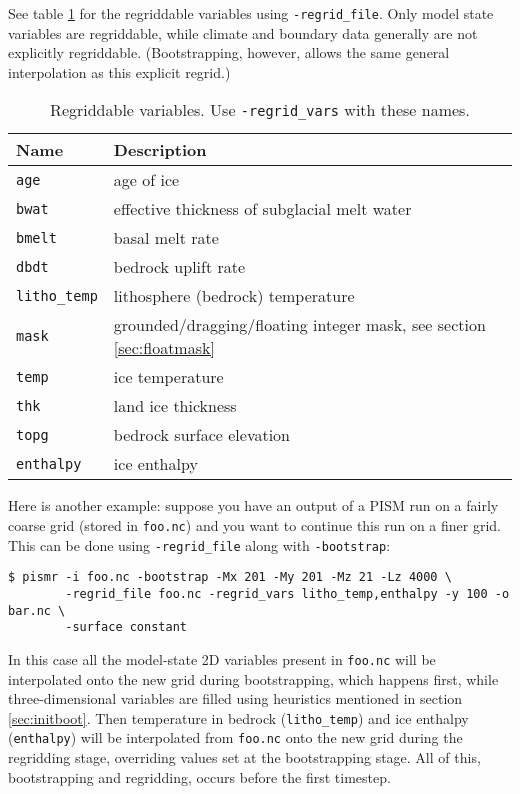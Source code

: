 See table \ref{tab:regridvar} for the regriddable variables using
\texttt{-regrid_file}.  Only model state variables are regriddable, while climate and boundary data generally are not explicitly regriddable.  (Bootstrapping, however, allows the same general interpolation as this explicit regrid.)

\begin{table}[ht]
  \centering
  \begin{tabular}{ll}\toprule
    \textbf{Name} & \textbf{Description}\\ \midrule
    \texttt{age} & age of ice\\
    \texttt{bwat} & effective thickness of subglacial melt water \\
    \texttt{bmelt} & basal melt rate \\
    \texttt{dbdt} & bedrock uplift rate \\
    \texttt{litho_temp} & lithosphere (bedrock) temperature \\
    \texttt{mask} & grounded/dragging/floating integer mask, see section \ref{sec:floatmask} \\
    \texttt{temp} & ice temperature \\
    \texttt{thk} & land ice thickness \\
    \texttt{topg} & bedrock surface elevation \\
    \texttt{enthalpy} & ice enthalpy\\
    \bottomrule
  \end{tabular}
\caption{Regriddable variables.  Use \texttt{-regrid_vars} with these names.}
\label{tab:regridvar}
\end{table}

Here is another example: suppose you have an output of a PISM run on a fairly
coarse grid (stored in \texttt{foo.nc}) and you want to continue this run on a
finer grid. This can be done using \texttt{-regrid_file} along with
\texttt{-bootstrap}:
\begin{verbatim}
$ pismr -i foo.nc -bootstrap -Mx 201 -My 201 -Mz 21 -Lz 4000 \
        -regrid_file foo.nc -regrid_vars litho_temp,enthalpy -y 100 -o bar.nc \
        -surface constant
\end{verbatim}
In this case all the model-state 2D variables present in \texttt{foo.nc} will
be interpolated onto the new grid during bootstrapping, which happens first,
while three-dimensional variables are filled using heuristics mentioned in
section \ref{sec:initboot}.  Then temperature in bedrock (\texttt{litho_temp}) and
ice enthalpy (\texttt{enthalpy}) will be interpolated from \texttt{foo.nc} onto the
new grid during the regridding stage, overriding values set at the
bootstrapping stage.  All of this, bootstrapping and regridding, occurs before
the first timestep.


